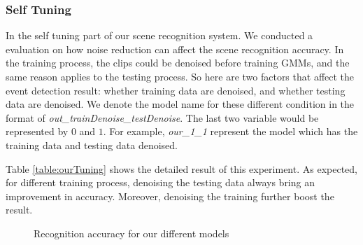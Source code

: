 \subsubsection{Self Tuning}
In the self tuning part of our scene recognition system. 
We conducted a evaluation on how noise reduction can affect the scene recognition accuracy. 
In the training process, the clips could be denoised before training GMMs, and the same reason applies to the testing process. 
So here are two factors that affect the event detection result: whether training data are denoised, and whether testing data are denoised. 
We denote the model name for these different condition in the format of \textit{out\_trainDenoise\_testDenoise}. 
The last two variable would be represented by $0$ and $1$. 
For example, \textit{our\_1\_1} represent the model which has the training data and testing data denoised.  

\begin{table}[htb!]
\centering
{}
\caption{Recognition accuracy for our different models}
\label{table:ourTuning}
\end{table}

Table \ref{table:ourTuning} shows the detailed result of this experiment. 
As expected, for different training process, denoising the testing data always bring an improvement in accuracy. 
Moreover, denoising the training further boost the result. 

\begin{figure}[htb!]
\centering

\caption{Recognition accuracy for our different models}
\label{fig:ourTuning}
\end{figure}

